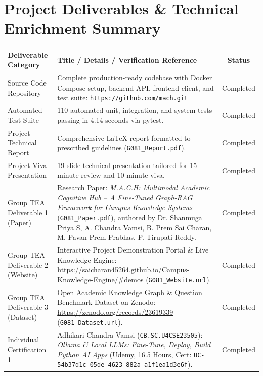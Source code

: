 \documentclass[11pt, a4paper]{article}
\begin{document}
\section{Project Deliverables \& Technical Enrichment Summary}
\begin{table}[H]
    \centering
    \footnotesize
    \renewcommand{\arraystretch}{1.2}
    \begin{tabular}{|p{4.0cm}|p{8.0cm}|c|}
        \hline
        \textbf{Deliverable Category} & \textbf{Title / Details / Verification Reference} & \textbf{Status} \\
        \hline
        Source Code Repository & Complete production-ready codebase with Docker Compose setup, backend API, frontend client, and test suite: \href{https://github.com/saicharan45264/Campus-Knowledge-Engine.git}{\texttt{https://github.com/mach.git}} & Completed \\
        \hline
        Automated Test Suite & 110 automated unit, integration, and system tests passing in 4.14 seconds via pytest. & Completed \\
        \hline
        Project Technical Report & Comprehensive LaTeX report formatted to prescribed guidelines (\texttt{G081\_Report.pdf}). & Completed \\
        \hline
        Project Viva Presentation & 19-slide technical presentation tailored for 15-minute review and 10-minute viva. & Completed \\
        \hline
        Group TEA Deliverable 1 (Paper) & Research Paper: \textit{M.A.C.H: Multimodal Academic Cognitive Hub -- A Fine-Tuned Graph-RAG Framework for Campus Knowledge Systems} (\texttt{G081\_Paper.pdf}), authored by Dr. Shanmuga Priya S, A. Chandra Vamsi, B. Prem Sai Charan, M. Pavan Prem Prabhas, P. Tirupati Reddy. & Completed \\
        \hline
        Group TEA Deliverable 2 (Website) & Interactive Project Demonstration Portal \& Live Knowledge Engine: \url{https://saicharan45264.github.io/Campus-Knowledge-Engine/#demos} (\texttt{G081\_Website.url}). & Completed \\
        \hline
        Group TEA Deliverable 3 (Dataset) & Open Academic Knowledge Graph \& Question Benchmark Dataset on Zenodo: \url{https://zenodo.org/records/23619339} (\texttt{G081\_Dataset.url}). & Completed \\
        \hline
        Individual Certification 1 & Adhikari Chandra Vamsi (\texttt{CB.SC.U4CSE23505}): \textit{Ollama \& Local LLMs: Fine-Tune, Deploy, Build Python AI Apps} (Udemy, 16.5 Hours, Cert: \texttt{UC-54b37d1c-05de-4623-882a-a1f1ea1d3e6f}). & Completed \\

\end{tabular}
\end{table}
\end{document}
